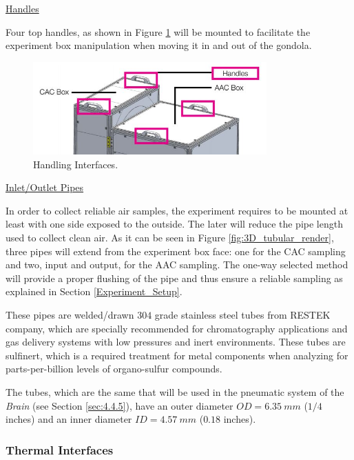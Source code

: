 \bigskip
\underline{Handles}

\smallskip
Four top handles, as shown in Figure \ref{fig:handles} will be mounted to facilitate the experiment box manipulation when moving it in and out of the gondola.

\begin{figure}[H]
    \centering
    \includegraphics[width=0.8\textwidth]{4-experiment-design/img/Mechanical/handles.jpg}
    \caption{Handling Interfaces.}
    \label{fig:handles}
\end{figure}

\bigskip
\underline{Inlet/Outlet Pipes}
\label{subsec:pipes}

\smallskip
In order to collect reliable air samples, the experiment requires to be mounted at least with one side exposed to the outside. The later will reduce the pipe length used to collect clean air. As it can be seen in Figure \ref{fig:3D_tubular_render}, three pipes will extend from the experiment box face: one for the CAC sampling and two, input and output, for the AAC sampling. The one-way selected method will provide a proper flushing of the pipe and thus ensure a reliable sampling as explained in Section \ref{Experiment_Setup}.

These pipes are welded/drawn $304$ grade stainless steel tubes from RESTEK company, which are specially recommended for chromatography applications and gas delivery systems with low pressures and inert environments. These tubes are sulfinert, which is a required treatment for metal components when analyzing for parts-per-billion levels of organo-sulfur compounds.

The tubes, which are the same that will be used in the pneumatic system of the \emph{Brain} (see Section \ref{sec:4.4.5}), have an outer diameter $OD = 6.35\ mm$ ($1/4$ inches) and an inner diameter $ID = 4.57\ mm$ ($0.18$ inches).

\subsubsection{Thermal Interfaces}
\label{sec:4.2.2}

